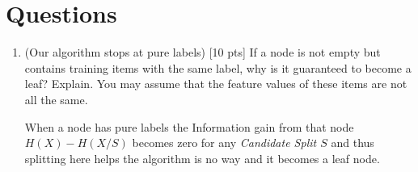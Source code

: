 \documentclass[a4paper]{article}
\theoremstyle{definition}
\newenvironment{soln}{
    \leavevmode\color{blue}\ignorespaces
}{}
\begin{document}
\section{Questions}
\begin{enumerate}
\item (Our algorithm stops at pure labels) [10 pts] If a node is not empty but contains training items with the same label, why is it guaranteed to become a leaf?  Explain. You may assume that the feature values of these items are not all the same.\\
\begin{soln}
    When a node has pure labels the Information gain from that node $H(X)-H(X/S)$ becomes zero for any \textit{Candidate Split $S$} and thus splitting here helps the algorithm is no way and it becomes a leaf node.
\end{soln}


\end{enumerate}
\end{document}
